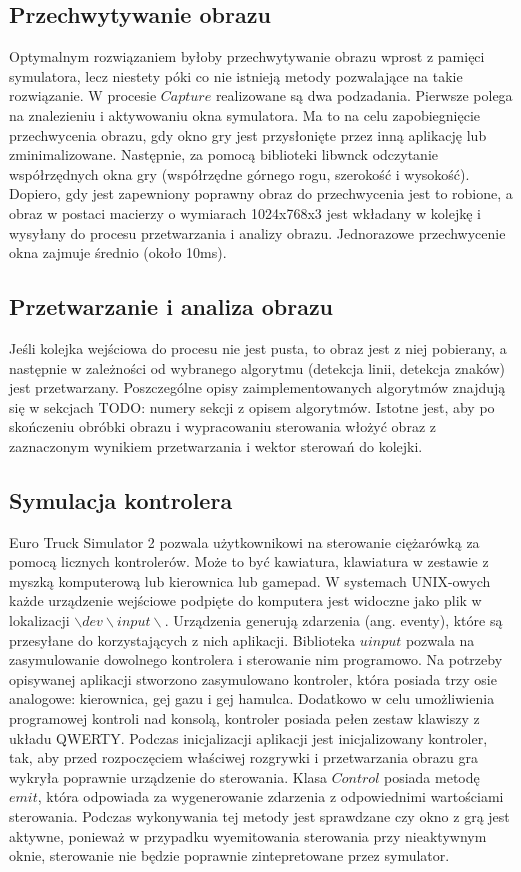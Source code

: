 \subsection{Przechwytywanie obrazu}
\label{sec:mechanism}
Optymalnym rozwiązaniem byłoby przechwytywanie obrazu wprost z pamięci symulatora, lecz niestety póki co nie istnieją metody pozwalające na takie rozwiązanie. W procesie $Capture$ realizowane są dwa podzadania. Pierwsze polega na znalezieniu i aktywowaniu okna symulatora. Ma to na celu zapobiegnięcie przechwycenia obrazu, gdy okno gry jest przysłonięte przez inną aplikację lub zminimalizowane. Następnie, za pomocą biblioteki libwnck odczytanie współrzędnych okna gry (współrzędne górnego rogu, szerokość i wysokość). Dopiero, gdy jest zapewniony poprawny obraz do przechwycenia jest to robione, a obraz w postaci macierzy o wymiarach 1024x768x3 jest wkładany w kolejkę i wysyłany do procesu przetwarzania i analizy obrazu. Jednorazowe przechwycenie okna zajmuje średnio (około 10ms).

\subsection{Przetwarzanie i analiza obrazu}
Jeśli kolejka wejściowa do procesu nie jest pusta, to obraz jest z niej pobierany, a następnie w zależności od wybranego algorytmu (detekcja linii, detekcja znaków) jest przetwarzany. Poszczególne opisy zaimplementowanych algorytmów znajdują się w sekcjach TODO: numery sekcji z opisem algorytmów. Istotne jest, aby po skończeniu obróbki obrazu i wypracowaniu sterowania włożyć obraz z zaznaczonym wynikiem przetwarzania i wektor sterowań do kolejki.

\subsection{Symulacja kontrolera}
Euro Truck Simulator 2 pozwala użytkownikowi na sterowanie ciężarówką za pomocą licznych kontrolerów. Może to być kawiatura, klawiatura w zestawie z myszką komputerową lub kierownica lub gamepad. W systemach UNIX-owych każde urządzenie wejściowe podpięte do komputera jest widoczne jako plik w lokalizacji $\backslash dev\backslash input\backslash $. Urządzenia generują zdarzenia (ang. eventy), które są przesyłane do korzystających z nich aplikacji. Biblioteka $uinput$ pozwala na zasymulowanie dowolnego kontrolera i sterowanie nim programowo. Na potrzeby opisywanej aplikacji stworzono zasymulowano kontroler, która posiada trzy osie analogowe: kierownica, gej gazu i gej hamulca. Dodatkowo w celu umożliwienia programowej kontroli nad konsolą, kontroler posiada pełen zestaw klawiszy z układu QWERTY. Podczas inicjalizacji aplikacji jest inicjalizowany kontroler, tak, aby przed rozpoczęciem właściwej rozgrywki i przetwarzania obrazu gra wykryła poprawnie urządzenie do sterowania. Klasa $Control$ posiada metodę $emit$, która odpowiada za wygenerowanie zdarzenia z odpowiednimi wartościami sterowania. Podczas wykonywania tej metody jest sprawdzane czy okno z grą jest aktywne, ponieważ w przypadku wyemitowania sterowania przy nieaktywnym oknie, sterowanie nie będzie poprawnie zintepretowane przez symulator.

